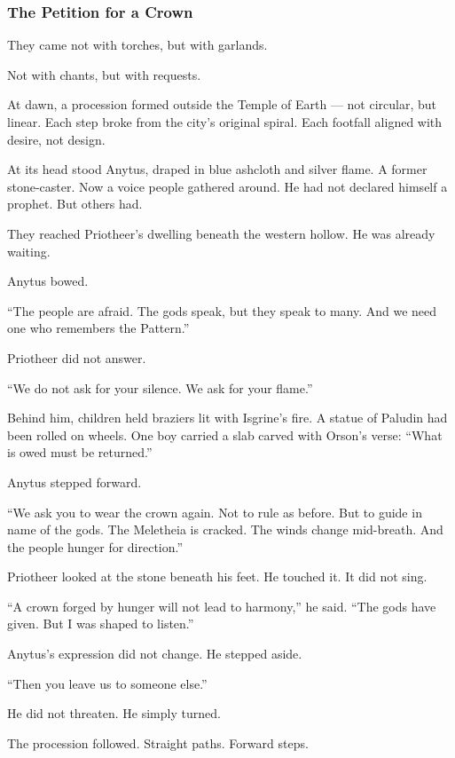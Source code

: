 \documentclass[12pt]{article}
\begin{document}
\vspace{.5in}

\subsubsection*{The Petition for a Crown}

They came not with torches, but with garlands.

Not with chants, but with requests.

At dawn, a procession formed outside the Temple of Earth —  
not circular, but linear.  
Each step broke from the city's original spiral.  
Each footfall aligned with desire, not design.

At its head stood Anytus, draped in blue ashcloth and silver flame.  
A former stone-caster. Now a voice people gathered around.  
He had not declared himself a prophet.  
But others had.

They reached Priotheer's dwelling beneath the western hollow.  
He was already waiting.

Anytus bowed.

 “The people are afraid.  
 The gods speak, but they speak to many.  
 And we need one who remembers the Pattern.”

Priotheer did not answer.

 “We do not ask for your silence.  
 We ask for your flame.”

Behind him, children held braziers lit with Isgrine’s fire.  
A statue of Paludin had been rolled on wheels.  
One boy carried a slab carved with Orson’s verse:  
 “What is owed must be returned.”

Anytus stepped forward.

 “We ask you to wear the crown again.  
 Not to rule as before.  
 But to guide in name of the gods.  
 The Meletheia is cracked.  
 The winds change mid-breath.  
 And the people hunger for direction.”

Priotheer looked at the stone beneath his feet.  
He touched it.  
It did not sing.

 “A crown forged by hunger will not lead to harmony,” he said.  
 “The gods have given.  
 But I was shaped to listen.”

Anytus’s expression did not change.  
He stepped aside.

 “Then you leave us to someone else.”

He did not threaten.  
He simply turned.

The procession followed.  
Straight paths. Forward steps.
\end{document}
